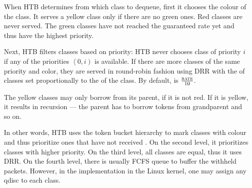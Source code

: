 When HTB determines from which class to dequeue, first it chooses the colour of the class. It serves a yellow class only if there are no green ones. Red classes are never served. The green classes have not reached the guaranteed rate yet and thus have the highest priority.

Next, HTB filters classes based on priority: HTB never chooses class of priority $i$ if any of the priorities $\left\langle0,i\right)$ is available. If there are more classes of the same priority and color, they are served in round-robin fashion using DRR with the  of classes set proportionally to the  of the class. By default,  is $\frac{\textsc{rate}}{10}$. 

The yellow classes may only borrow from its parent, if it is not red. If it is yellow, it results in recursion --- the parent has to borrow tokens from grandparent and so on.

In other words, HTB uses the token bucket hierarchy to mark classes with colour and thus prioritize ones that have not received . On the second level, it prioritizes classes with higher priority. On the third level, all classes are equal, thus it uses DRR. On the fourth level, there is usually FCFS queue to buffer the withheld packets. However, in the implementation in the Linux kernel, one may assign any qdisc to each class.

